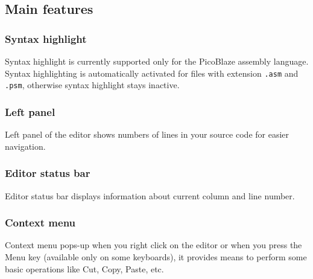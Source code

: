     \subsection{Main features}
        \subsubsection{Syntax highlight}
            Syntax highlight is currently supported only for the PicoBlaze assembly language. Syntax highlighting is automatically activated for files with extension \texttt{.asm} and \texttt{.psm}, otherwise syntax highlight stays inactive.

        \subsubsection{Left panel}
            Left panel of the editor shows numbers of lines in your source code for easier navigation.

        \subsubsection{Editor status bar}
            Editor status bar displays information about current column and line number.

        \subsubsection{Context menu}
            Context menu pops-up when you right click on the editor or when you press the Menu key (available only on some keyboards), it provides means to perform some basic operations like Cut, Copy, Paste, etc.

    \enlargethispage{6\baselineskip}
